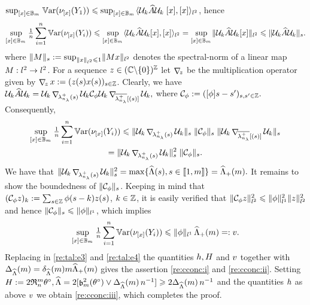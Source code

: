 \begin{pro}
  $\sup_{\He\in\mBaH}\Var(\nu_{\He}(Y_1))
  \leq \sup_{\He\in\mBaH} \Vskalarlp{\DiPro[k]\hA\DiPro[k] \;\fHe{},\fHe{}}$, hence
 \begin{multline*}
   \sup_{\He\in\mBaH} \tfrac{1}{\ssY}\sum_{i=1}^{\ssY}\Var(\nu_{\He}(Y_i))
 \leq \sup_{\He\in\mBaH} \Vskalarlp{\DiPro[k]\hA\DiPro[k]\fHe{},\fHe{}}= \sup_{\He\in\mBaH} \Vnormlp{\DiPro[k]\hA\DiPro[k]\fHe{}}\leq\Vnorm[s]{\DiPro[k]\hA\DiPro[k]}.
 \end{multline*}
 where $\Vnorm[s]{M}:=\sup_{\Vnormlp{x}\leq 1}\Vnormlp{Mx}$ denotes the
 spectral-norm of a linear map $M:\lp^2\to\lp^2$. For  a
 sequence $z\in(\Cz\backslash\{0\})^\Zz$ let $\Diag{z}$   be the multiplication operator
 given by $\Diag{z}x:=\Zsuite{z(s) x(s)}$.   Clearly, we have
  $\DiPro[k]\hA\DiPro[k] = \DiPro[k]\Diag{\hfedfmpI} \DiPro[k]  \cC_{\fydf}
  \DiPro[k] \Diag  {\ohfedfmpI}\DiPro[k],$
 where $  \cC_{\fydf} := \Zsuite[s,s']{\fou[s-s']{\ydf}}.$
 Consequently,
 \begin{multline*}
    \sup_{\He\in\mBaH}\tfrac{1}{\ssY}\sum_{i=1}^{\ssY}\Var(\nu_{\He}(Y_i))
 \leq \Vnorm[s]{\DiPro[k]\Diag{\hfedfmpI}\DiPro[k]}\; \Vnorm[s]{ \cC_{\fydf}}\;\Vnorm[s]{\DiPro[k]\Diag{\ohfedfmpI}\DiPro[k]}\\=
 \Vnorm[s]{\DiPro[k]\Diag{\hfedfmpI} \DiPro[k]}^2\; \Vnorm[s]{\cC_{\fydf}}.
 \end{multline*}
 We have that $\Vnorm[s]{\DiPro[k]\Diag{\hfedfmpI}\DiPro[k]}^2= \max\{\eiSv[(s)],s\in\nset{1,\Di}\}=\meiSv.$
 It remains to show the boundedness of $\Vnorm[s]{\cC_{\fydf}}$. 
 Keeping in mind that $(\cC_{\fydf}z)_k:=
 \sum_{s\in\Zz}\fydf[(s-k)]z(s)$, $k\in\Zz$, it is
 easily verified that $\Vnormlp{\cC_{\fydf} z}^2\leq
 \Vnormlp[1]{\fydf}^2\Vnormlp{z}^2$  and hence $ \Vnorm[s]{\cC_{\fydf}}\leq\Vnormlp[1]{\fydf}$, which
   implies
   \begin{equation*}
     \sup_{\He\in\mBaH}\tfrac{1}{\ssY}\sum_{i=1}^{\ssY}\Var(\nu_{\He}(Y_i))\leq\Vnormlp[1]{\fydf}\,\meiSv=:\Tcv.
   \end{equation*}
   Replacing in  \eqref{re:tal:e3} and \eqref{re:tal:e4}
   the quantities $\Tch,\TcH$ and $\Tcv$ together with
   $\DipeneSv=\cmeiSv\Di\meiSv$ gives the assertion \ref{re:cconc:i} and
   \ref{re:cconc:ii}. Setting
   $\TcH:=2\daRa{\Di}{\xdf,\eiSv}=2[\bias^2(\xdf)\vee
   \DipeneSv\,\ssY^{-1}]\geq 2\DipeneSv\,\ssY^{-1}$ and the quantities
   $\Tch$ as above $\Tcv$ we obtain \ref{re:cconc:iii}, which completes the
   proof.\proEnd
 \end{pro}
